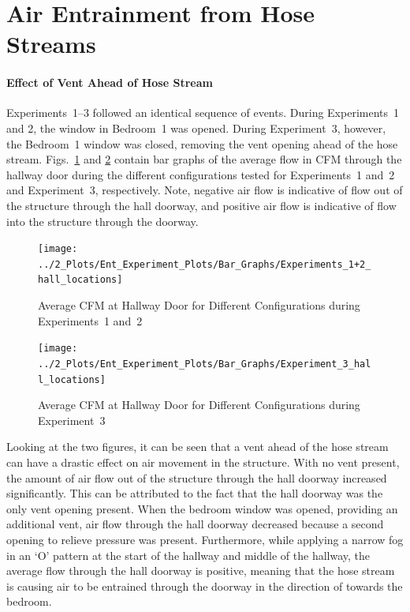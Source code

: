\documentclass[12pt,oneside]{book}
\begin{document}
\section{Air Entrainment from Hose Streams}

\paragraph{Effect of Vent Ahead of Hose Stream} \mbox{}

Experiments~1--3 followed an identical sequence of events. During Experiments~1 and 2, the window in Bedroom~1 was opened. During Experiment~3, however, the Bedroom~1 window was closed, removing the vent opening ahead of the hose stream. Figs.~\ref{fig:Exps1_and_2_bar_graph} and \ref{fig:Exp3_bar_graph} contain bar graphs of the average flow in CFM through the hallway door during the different configurations tested for Experiments~1 and~2 and Experiment~3, respectively. Note, negative air flow is indicative of flow out of the structure through the hall doorway, and positive air flow is indicative of flow into the structure through the doorway.
\\
\begin{figure}[H]{}
	\centering
	\texttt{[image: ../2\_Plots/Ent\_Experiment\_Plots/Bar\_Graphs/Experiments\_1+2\_hall\_locations]}
	\caption{Average CFM at Hallway Door for Different Configurations during Experiments~1 and~2}
	\label{fig:Exps1_and_2_bar_graph}
\end{figure}

\begin{figure}[H]
	\centering
	\texttt{[image: ../2\_Plots/Ent\_Experiment\_Plots/Bar\_Graphs/Experiment\_3\_hall\_locations]}
	\caption{Average CFM at Hallway Door for Different Configurations during Experiment~3}
	\label{fig:Exp3_bar_graph}
\end{figure}

Looking at the two figures, it can be seen that a vent ahead of the hose stream can have a drastic effect on air movement in the structure. With no vent present, the amount of air flow out of the structure through the hall doorway increased significantly. This can be attributed to the fact that the hall doorway was the only vent opening present. When the bedroom window was opened, providing an additional vent, air flow through the hall doorway decreased because a second opening to relieve pressure was present. Furthermore, while applying a narrow fog in an `O' pattern at the start of the hallway and middle of the hallway, the average flow through the hall doorway is positive, meaning that the hose stream is causing air to be entrained through the doorway in the direction of towards the bedroom. 
\end{document}
